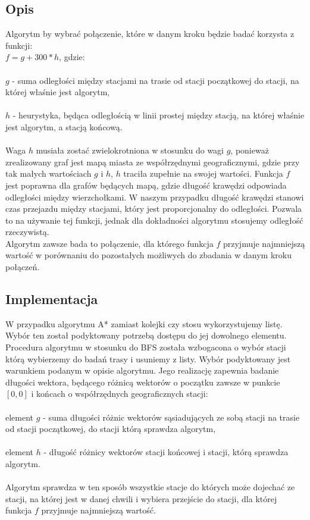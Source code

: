 \documentclass[13pt]{article}
\begin{document}
\subsection{Opis}
Algorytm by wybrać połączenie, które w danym kroku będzie badać korzysta z funkcji:\\
$f=g+300*h$, gdzie:\\\\
$g$ - suma odległości między stacjami na trasie od stacji początkowej do stacji, na której właśnie jest algorytm,\\\\
$h$ - heurystyka, będąca odległością w linii prostej między stacją, na której właśnie jest algorytm, a stacją końcową.\\\\
Waga $h$ musiała zostać zwielokrotniona w stosunku do wagi $g$, ponieważ zrealizowany graf jest mapą miasta ze współrzędnymi geograficznymi, gdzie przy tak małych wartościach $g$ i $h$, $h$ traciła zupełnie na swojej wartości.
Funkcja $f$ jest poprawna dla grafów będących mapą, gdzie długość krawędzi odpowiada odległości między wierzchołkami. W naszym przypadku długość krawędzi stanowi czas przejazdu między stacjami, który jest proporcjonalny do odległości. Pozwala to na używanie tej funkcji, jednak dla dokładności algorytmu stosujemy odległość rzeczywistą.\\
Algorytm zawsze bada to połączenie, dla którego funkcja $f$ przyjmuje najmniejszą wartość w porównaniu do pozostałych możliwych do zbadania w danym kroku połączeń.

\subsection{Implementacja}
W przypadku algorytmu A* zamiast kolejki czy stosu wykorzystujemy listę. Wybór ten został podyktowany potrzebą dostępu do jej dowolnego elementu. Procedura algorytmu w stosunku do BFS została wzbogacona o wybór stacji którą wybierzemy do badań trasy i usuniemy z listy. Wybór podyktowany jest warunkiem podanym w opisie algorytmu. Jego realizację zapewnia badanie długości wektora, będącego różnicą wektorów o początku zawsze w punkcie $[0,0]$ i końcach o współrzędnych geograficznych stacji:\\\\
element $g$ - suma długości różnic wektorów sąsiadujących ze sobą stacji na trasie od stacji początkowej, do stacji którą sprawdza algorytm,\\\\
element $h$ - długość różnicy wektorów stacji końcowej i stacji, którą sprawdza algorytm.\\\\
Algorytm sprawdza w ten sposób wszystkie stacje do których może dojechać ze stacji, na której jest w danej chwili i wybiera przejście do stacji, dla której funkcja $f$ przyjmuje najmniejszą wartość.
\end{document}
